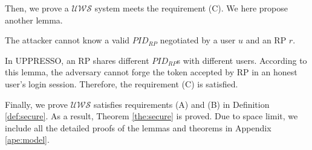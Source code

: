 
Then, we prove a $\mathcal{UWS}$ system meets the requirement (C). We here propose another lemma.
\vspace{-\topsep}
\begin{lemma}
The attacker cannot know a valid $PID_{RP}$ negotiated by a user $u$ and an RP $r$.
\label{lemma:PID}
\end{lemma}
\vspace{-\topsep}
In UPPRESSO, an RP shares different $PID_{RP}$s with different users. According to this lemma, the adversary cannot forge the token accepted by RP in an honest user's login session. Therefore, the requirement (C) is satisfied.


Finally, we prove $\mathcal{UWS}$ satisfies requirements (A) and (B) in Definition \ref{def:secure}. As a result, Theorem \ref{the:secure} is proved.  Due to space limit, we include all the detailed proofs of the lemmas and theorems in Appendix \ref{ape:model}.

